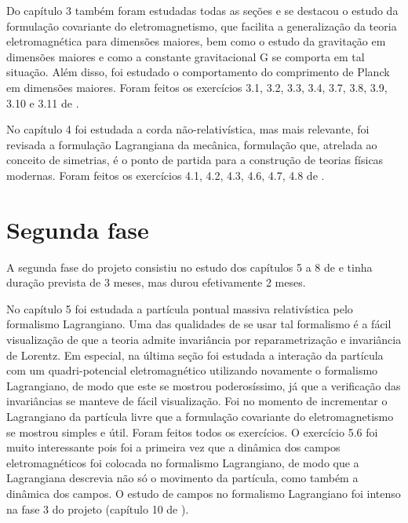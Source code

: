 \documentclass[oneside, 12pt]{article}
\begin{document}
Do capítulo 3 também foram estudadas todas as seções e se destacou o estudo da formulação covariante do eletromagnetismo, que facilita a generalização da teoria eletromagnética para dimensões maiores, bem como o estudo da gravitação em dimensões maiores e como a constante gravitacional G se comporta em tal situação. Além disso, foi estudado o comportamento do comprimento de Planck em dimensões maiores. Foram feitos os exercícios 3.1, 3.2, 3.3, 3.4, 3.7, 3.8, 3.9, 3.10 e 3.11 de \cite{barton}.\par 

No capítulo 4 foi estudada a corda não-relativística, mas mais relevante, foi revisada a formulação Lagrangiana da mecânica, formulação que, atrelada ao conceito de simetrias, é o ponto de partida para a construção de teorias físicas modernas. Foram feitos os exercícios 4.1, 4.2, 4.3, 4.6, 4.7, 4.8 de \cite{barton}.\par 

\section{Segunda fase}

A segunda fase do projeto consistiu no estudo dos capítulos 5 a 8 de \cite{barton} e tinha duração prevista de 3 meses, mas durou efetivamente 2 meses.\par 

No capítulo 5 foi estudada a partícula pontual massiva relativística pelo formalismo Lagrangiano. Uma das qualidades de se usar tal formalismo é a fácil visualização de que a teoria admite invariância por reparametrização e invariância de Lorentz. Em especial, na última seção foi estudada a interação da partícula com um quadri-potencial eletromagnético utilizando novamente o formalismo Lagrangiano, de modo que este se mostrou poderosíssimo, já que a verificação das invariâncias se manteve de fácil visualização. Foi no momento de incrementar o Lagrangiano da partícula livre que a formulação covariante do eletromagnetismo se mostrou simples e útil. Foram feitos todos os exercícios. O exercício 5.6 foi muito interessante pois foi a primeira vez que a dinâmica dos campos eletromagnéticos foi colocada no formalismo Lagrangiano, de modo que a Lagrangiana descrevia não só o movimento da partícula, como também a dinâmica dos campos. O estudo de campos no formalismo Lagrangiano foi intenso na fase 3 do projeto (capítulo 10 de \cite{barton}).\par 
\end{document}
